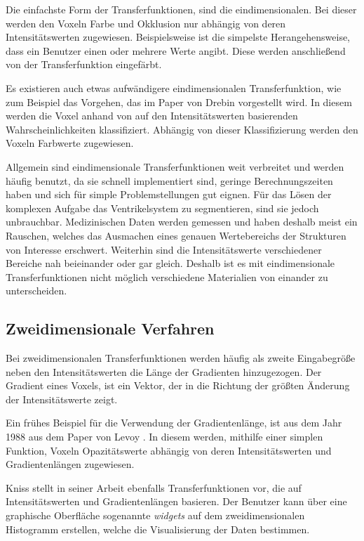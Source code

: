 Die einfachste Form der Transferfunktionen, sind die eindimensionalen. Bei dieser werden den Voxeln Farbe und Okklusion nur abhängig von deren Intensitätswerten zugewiesen. Beispielsweise ist die simpelste Herangehensweise, dass ein Benutzer einen oder mehrere Werte angibt. Diese werden anschließend von der Transferfunktion eingefärbt.

Es existieren auch etwas aufwändigere eindimensionalen Transferfunktion, wie zum Beispiel das Vorgehen, das im Paper von Drebin \cite{drebin1988volume} vorgestellt wird. In diesem werden die Voxel anhand von auf den Intensitätswerten basierenden Wahrscheinlichkeiten klassifiziert. Abhängig von dieser Klassifizierung werden den Voxeln Farbwerte zugewiesen.

Allgemein sind eindimensionale Transferfunktionen weit verbreitet und werden häufig benutzt, da sie schnell implementiert sind, geringe Berechnungszeiten haben und sich für simple Problemstellungen gut eignen.
\newline
Für das Lösen der komplexen Aufgabe das Ventrikelsystem zu segmentieren, sind sie jedoch unbrauchbar. Medizinischen Daten werden gemessen und haben deshalb meist ein Rauschen, welches das Ausmachen eines genauen Wertebereichs der Strukturen von Interesse erschwert. Weiterhin sind die Intensitätswerte verschiedener Bereiche nah beieinander oder gar gleich. Deshalb ist es mit eindimensionale Transferfunktionen nicht möglich verschiedene Materialien von einander zu unterscheiden.



\subsection{Zweidimensionale Verfahren}

Bei zweidimensionalen Transferfunktionen werden häufig als zweite Eingabegröße neben den Intensitätswerten die Länge der Gradienten hinzugezogen. Der Gradient eines Voxels, ist ein Vektor, der in die Richtung der größten Änderung der Intensitätswerte zeigt.


Ein frühes Beispiel für die Verwendung der Gradientenlänge, ist aus dem Jahr 1988 aus dem Paper von Levoy \cite{levoy1988display}. In diesem werden, mithilfe einer simplen Funktion, Voxeln Opazitätswerte abhängig von deren Intensitätswerten und Gradientenlängen zugewiesen.


Kniss stellt in seiner Arbeit \cite{kniss2002multidimensional} ebenfalls Transferfunktionen vor, die auf Intensitätswerten und Gradientenlängen basieren. Der Benutzer kann über eine graphische Oberfläche sogenannte \textit{widgets} auf dem zweidimensionalen Histogramm erstellen, welche die Visualisierung der Daten bestimmen.


